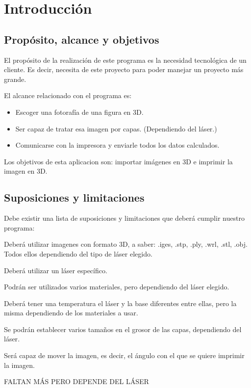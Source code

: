 \documentclass[a4paper,11pt, twoside]{article}
\begin{document}
\newpage
\thispagestyle{empty}
\tableofcontents
\cleardoublepage
\thispagestyle{empty}
\listoffigures %

\cleardoublepage
\thispagestyle{empty}
\listoftables %

\newpage
\setcounter{page}{1}
\section{Introducción}
\subsection{Propósito, alcance y objetivos} 
El propósito de la realización de este programa es la necesidad tecnológica de un cliente. Es decir, necesita de este proyecto para poder manejar un proyecto más grande.

El alcance relacionado con el programa es:
\vspace{-2.5mm}
\begin{itemize}[noitemsep,topsep=0pt]
   \item Escoger una fotorafía de una figura en 3D.
   \item Ser capaz de tratar esa imagen por capas. (Dependiendo del láser.)
   \item Comunicarse con la impresora y enviarle todos los datos calculados.
\end{itemize}

Los objetivos de esta aplicacion son: importar imágenes en 3D e imprimir la imagen en 3D.
\subsection{Suposiciones y limitaciones}
Debe existir una lista de suposiciones y limitaciones que deberá cumplir nuestro programa:
\vspace{-2.5mm}
\begin{itemize}[noitemsep,topsep=0pt]
\item Deberá utilizar imagenes con formato 3D, a saber: .iges, .stp, .ply, .wrl, .stl, .obj. {\color{magenta}Todos ellos dependiendo del tipo de láser elegido}.
\item Deberá utilizar un láser específico.
\item Podrán ser utilizados varios materiales, {\color{magenta}pero dependiendo del láser elegido}.
\item Deberá tener una temperatura el láser y la base diferentes entre ellas, pero la misma dependiendo de los materiales a usar.
\item Se podrán establecer varios tamaños en el grosor de las capas, {\color{magenta}dependiendo del láser}.
\item Será capaz de mover la imagen, es decir, el ángulo con el que se quiere imprimir la imagen.
{\color{magenta} \item FALTAN MÁS PERO DEPENDE DEL LÁSER}
\end{itemize}
\end{document}
